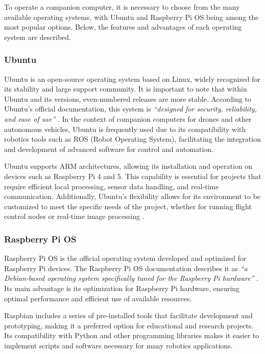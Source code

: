 To operate a companion computer, it is necessary to choose from the many available operating systems, with Ubuntu and Raspberry Pi OS being among the most popular options. Below, the features and advantages of each operating system are described.

\subsubsection{Ubuntu}

Ubuntu is an open-source operating system based on Linux, widely recognized for its stability and large support community. It is important to note that within Ubuntu and its versions, even-numbered releases are more stable. According to Ubuntu's official documentation, this system is \textit{“designed for security, reliability, and ease of use”} \cite{ubuntu_docs}. In the context of companion computers for drones and other autonomous vehicles, Ubuntu is frequently used due to its compatibility with robotics tools such as ROS (Robot Operating System), facilitating the integration and development of advanced software for control and automation.

Ubuntu supports ARM architectures, allowing its installation and operation on devices such as Raspberry Pi 4 and 5. This capability is essential for projects that require efficient local processing, sensor data handling, and real-time communication. Additionally, Ubuntu's flexibility allows for its environment to be customized to meet the specific needs of the project, whether for running flight control nodes or real-time image processing \cite{ubuntu_docs}.

\subsubsection{Raspberry Pi OS}

Raspberry Pi OS is the official operating system developed and optimized for Raspberry Pi devices. The Raspberry Pi OS documentation describes it as \textit{“a Debian-based operating system specifically tuned for the Raspberry Pi hardware”} \cite{raspbian_docs}. Its main advantage is its optimization for Raspberry Pi hardware, ensuring optimal performance and efficient use of available resources.

Raspbian includes a series of pre-installed tools that facilitate development and prototyping, making it a preferred option for educational and research projects. Its compatibility with Python and other programming libraries makes it easier to implement scripts and software necessary for many robotics applications.

